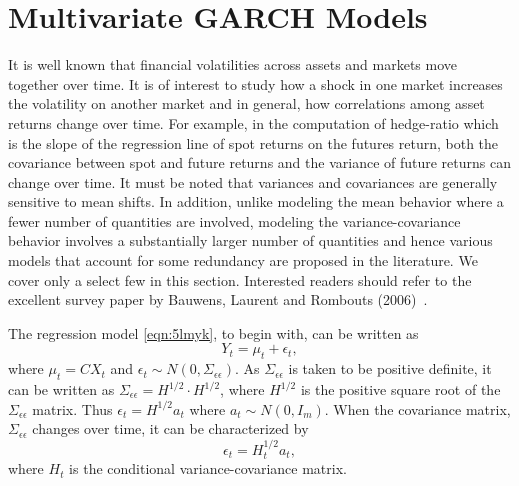 \section{Multivariate GARCH Models}\label{in:multgarch1} \label{in:modelvar2}

It is well known that financial volatilities across assets and markets move together over time. It is of interest to study how a shock in one market increases the volatility on another market and in general, how correlations among asset returns change over time. For example, in the computation of hedge-ratio which is the slope of the regression line of spot returns on the futures return, both the covariance between spot and future returns and the variance of future returns can change over time. It must be noted that variances and covariances are generally sensitive to mean shifts. In addition, unlike modeling the mean behavior where a fewer number of quantities are involved, modeling the variance-covariance behavior involves a substantially larger number of quantities and hence various models that account for some redundancy are proposed in the literature. We cover only a select few in this section. Interested readers should refer to the excellent survey paper by Bauwens, Laurent and Rombouts (2006)~\cite{laurent}.


The regression model \eqref{eqn:5lmyk}, to begin with, can be written as
	\begin{equation} \label{eqn:3relabel}
	Y_t= \mu_t+\epsilon_t,
	\end{equation}
where $\mu_t=CX_t$ and $\epsilon_t \sim N(0,\Sigma_{\epsilon\epsilon})$. As $\Sigma_{\epsilon\epsilon}$ is taken to be positive definite, it can be written as $\Sigma_{\epsilon\epsilon}= H^{1/2} \cdot H^{1/2}$, where $H^{1/2}$ is the positive square root of the $\Sigma_{\epsilon\epsilon}$ matrix. Thus $\epsilon_t= H^{1/2} a_t$ where $a_t \sim N(0,I_m)$. When the covariance matrix, $\Sigma_{\epsilon\epsilon}$ changes over time, it can be characterized by
	\begin{equation}
	\epsilon_t=H^{1/2}_t a_t,
	\end{equation}
where $H_t$ is the conditional variance-covariance matrix.


